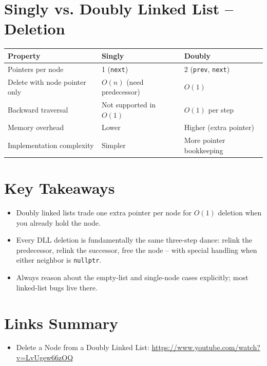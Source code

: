\documentclass[11pt]{article}
\begin{document}
\section{Singly vs. Doubly Linked List -- Deletion}
\begin{center}
\begin{tabular}{l|l|l}
\textbf{Property}               & \textbf{Singly} & \textbf{Doubly} \\ \hline
Pointers per node               & 1 (\texttt{next})                & 2 (\texttt{prev}, \texttt{next}) \\
Delete with node pointer only   & $O(n)$ (need predecessor)        & $O(1)$                            \\
Backward traversal              & Not supported in $O(1)$          & $O(1)$ per step                   \\
Memory overhead                 & Lower                             & Higher (extra pointer)            \\
Implementation complexity       & Simpler                           & More pointer bookkeeping          \\
\end{tabular}
\end{center}

\section*{Key Takeaways}
\begin{itemize}[leftmargin=*]
    \item Doubly linked lists trade one extra pointer per node for $O(1)$
          deletion when you already hold the node.
    \item Every DLL deletion is fundamentally the same three-step dance:
          relink the predecessor, relink the successor, free the node --
          with special handling when either neighbor is \texttt{nullptr}.
    \item Always reason about the empty-list and single-node cases
          explicitly; most linked-list bugs live there.
\end{itemize}

\section*{Links Summary}
\begin{itemize}[leftmargin=*]
    \item Delete a Node from a Doubly Linked List: \url{https://www.youtube.com/watch?v=LvUgew66zOQ}
\end{itemize}
\end{document}
